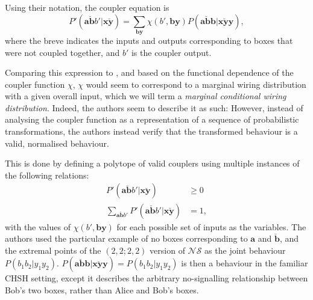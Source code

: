 \documentclass[10pt, a4paper]{article}
\numberwithin{equation}{section} %
\theoremstyle{definition}
\theoremstyle{plain}
\newcommand{\?}{\mathrel{?}} %
\newcommand{\cvec}[1]{\boldsymbol{\mathbf{#1}}}    %
\newcommand{\NSs}{\mathcal{NS}}
\begin{document}
                  Using their notation, the coupler equation is~\cite[Eq. 29]{ShortEntangleSwap}
                  \begin{equation}
                    P'(\cvec{a\breve{b}}b'|\cvec{x\breve{y}}) = \sum_{\cvec{by}} \chi(b',\cvec{by})P(\cvec{a\breve{b}b}|\cvec{x\breve{y}y}),
                  \end{equation}
                  where the breve indicates the inputs and outputs corresponding to boxes that were not coupled together, and \(b'\) is the coupler output.

                  Comparing this expression to , and based on the functional dependence of the coupler function \(\chi\), \(\chi\) would seem to correspond to a marginal wiring distribution with a given overall input, which we will term a \emph{marginal conditional wiring distribution}. Indeed, the authors seem to describe it as such:
                  However, instead of analysing the coupler function as a representation of a sequence of probabilistic transformations, the authors instead verify that the transformed behaviour is a valid, normalised behaviour.

                  This is done by defining a polytope of valid couplers using multiple instances of the following relations:
                  \begin{align}
                    P'(\cvec{a\breve{b}}b'|\cvec{x\breve{y}}) &\geq 0 \\
                    \sum_{\cvec{a\breve{b}}b'} P'(\cvec{a\breve{b}}b'|\cvec{x\breve{y}}) &= 1,
                  \end{align}
                  with the values of \(\chi(b',\cvec{by})\) for each possible set of inputs as the variables. The authors used the particular example of no boxes corresponding to \(\cvec{a}\) and \(\cvec{\breve{b}}\), and the extremal points of the \((2,2;2,2)\) version of \(\NSs\) as the joint behaviour \(P(b_1b_2|y_1y_2)\).  \(P(\cvec{a\breve{b}b}|\cvec{x\breve{y}y}) = P(b_1b_2|y_1y_2)\) is then a behaviour in the familiar CHSH setting, except it describes the arbitrary no-signalling relationship between Bob's two boxes, rather than Alice and Bob's boxes.
\end{document}
